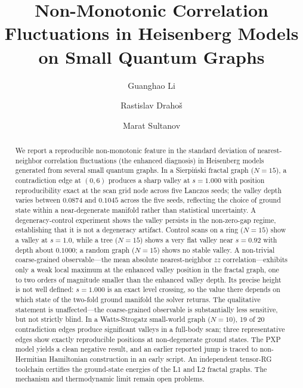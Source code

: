 \documentclass[aps,prb,reprint,superscriptaddress]{revtex4-2}
\begin{document}
\title{Non-Monotonic Correlation Fluctuations in Heisenberg Models on Small Quantum Graphs}
\author{Guanghao Li}
\author{Rastislav Draho\v{s}}
\author{Marat Sultanov}

\begin{abstract}
We report a reproducible non-monotonic feature in the standard deviation of nearest-neighbor correlation fluctuations (the enhanced diagnosis) in Heisenberg models generated from several small quantum graphs. In a Sierpi\'{n}ski fractal graph ($N=15$), a contradiction edge at $(0,6)$ produces a sharp valley at $s=1.000$ with position reproducibility exact at the scan grid node across five Lanczos seeds; the valley depth varies between $0.0874$ and $0.1045$ across the five seeds, reflecting the choice of ground state within a near-degenerate manifold rather than statistical uncertainty. A degeneracy-control experiment shows the valley persists in the non-zero-gap regime, establishing that it is not a degeneracy artifact. Control scans on a ring ($N=15$) show a valley at $s=1.0$, while a tree ($N=15$) shows a very flat valley near $s=0.92$ with depth about $0.1000$; a random graph ($N=15$) shows no stable valley. A non-trivial coarse-grained observable---the mean absolute nearest-neighbor $zz$ correlation---exhibits only a weak local maximum at the enhanced valley position in the fractal graph, one to two orders of magnitude smaller than the enhanced valley depth. Its precise height is not well defined: $s=1.000$ is an exact level crossing, so the value there depends on which state of the two-fold ground manifold the solver returns. The qualitative statement is unaffected---the coarse-grained observable is substantially less sensitive, but not strictly blind. In a Watts-Strogatz small-world graph ($N=10$), 19 of 20 contradiction edges produce significant valleys in a full-body scan; three representative edges show exactly reproducible positions at non-degenerate ground states. The PXP model yields a clean negative result, and an earlier reported jump is traced to non-Hermitian Hamiltonian construction in an early script. An independent tensor-RG toolchain certifies the ground-state energies of the L1 and L2 fractal graphs. The mechanism and thermodynamic limit remain open problems.
\end{abstract}

\maketitle
\end{document}
